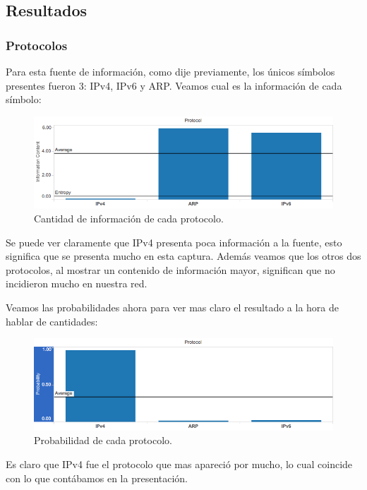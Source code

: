 \documentclass{article}
\theoremstyle{definition}
\theoremstyle{remark}
\begin{document}
\subsection{Resultados}
\subsubsection{Protocolos}
Para esta fuente de información, como dije previamente, los únicos símbolos presentes fueron 3: IPv4, IPv6 y ARP. Veamos cual es la información de cada símbolo:

\begin{figure}[H]
\centering
\includegraphics[width=420pt]{captures/MercadoLibre/Protocol PDF Dashboard.png}
\caption{Cantidad de información de cada protocolo.}
\end{figure}

Se puede ver claramente que IPv4 presenta poca información a la fuente, esto significa que se presenta mucho en esta captura. Además veamos que los otros dos protocolos, al mostrar un contenido de información mayor, significan que no incidieron mucho en nuestra red.

\par Veamos las probabilidades ahora para ver mas claro el resultado a la hora de hablar de cantidades:

\begin{figure}[H]
\centering
\includegraphics[width=420pt]{captures/MercadoLibre/Protocol PDF Dashboard probability.png}
\caption{Probabilidad de cada protocolo.}
\end{figure}

Es claro que IPv4 fue el protocolo que mas apareció por mucho, lo cual coincide con lo que contábamos en la presentación. 
\end{document}
